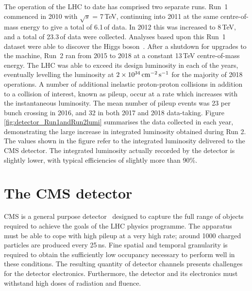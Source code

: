 The operation of the LHC to date has comprised two separate runs.
Run~1 commenced in 2010 with $\sqrt{s}$ = 7\,TeV, continuing into 2011 at the same centre-of-mass energy to give a total of 6.1\,\fbinv of data.
In 2012 this was increased to 8\,TeV, and a total of 23.3\,\fbinv of data were collected.
Analyses based upon this Run~1 dataset were able to discover the Higgs boson~\cite{ATLASdiscovery,CMSdiscovery}.
After a shutdown for upgrades to the machine, Run~2 ran from 2015 to 2018 at a constant 13\,TeV centre-of-mass energy.
The LHC was able to exceed its design luminosity in each of the years, eventually levelling the luminosity at $\SI{2e34}{\ensuremath{\textrm{cm}^{-2}\,\textrm{s}^{-1}}}$ for the majority of 2018 operations.
A number of additional inelastic proton-proton collisions in addition to a collision of interest, known as pileup, occur at a rate which increases with the instantaneous luminosity.
The mean number of pileup events was 23 per bunch crossing in 2016, and 32 in both 2017 and 2018 data-taking.
Figure \ref{fig:detector_Run1andRun2lumi} summarises the data collected in each year, 
demonstrating the large increase in integrated luminosity obtained during Run 2.
The values shown in the figure refer to the integrated luminosity delivered to the CMS detector.
The integrated luminosity actually recorded by the detector is slightly lower, 
with typical efficiencies of slightly more than 90\%. 

\section{The CMS detector}

CMS is a general purpose detector~\cite{CMSdetector} designed to capture the full range of objects required to achieve the goals of the LHC physics programme.
The apparatus must be able to cope with high pileup at a very high rate; around 1000 charged particles are produced every 25\,ns.
Fine spatial and temporal granularity is required to obtain the sufficiently low occupancy necessary to perform well in these conditions.
The resulting quantity of detector channels presents challenges for the detector electronics.
Furthermore, the detector and its electronics must withstand high doses of radiation and fluence.

